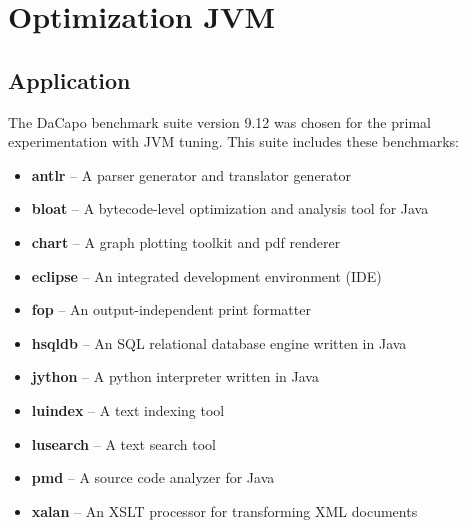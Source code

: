 \documentclass[
  digital, %
  oneside,
  notable, %
  nolof,     %
  nolot     %
]{fithesis3}
\begin{document}




\chapter{Optimization JVM}

\section{Application}

The DaCapo benchmark suite version 9.12 was chosen for the primal experimentation with JVM tuning. This suite includes these benchmarks: \cite{DaCapo:paper}
\begin{itemize}
	\item \textbf{antlr} -- A parser generator and translator generator
	\item \textbf{bloat} -- A bytecode-level optimization and analysis tool for Java
	\item \textbf{chart} -- A graph plotting toolkit and pdf renderer
	\item \textbf{eclipse} -- An integrated development environment (IDE)
	\item \textbf{fop} -- An output-independent print formatter
	\item \textbf{hsqldb} -- An SQL relational database engine written in Java
	\item \textbf{jython} -- A python interpreter written in Java
	\item \textbf{luindex} -- A text indexing tool
	\item \textbf{lusearch} -- A text search tool
	\item \textbf{pmd} -- A source code analyzer for Java
	\item \textbf{xalan} -- An XSLT processor for transforming XML documents
\end{itemize}
\end{document}
